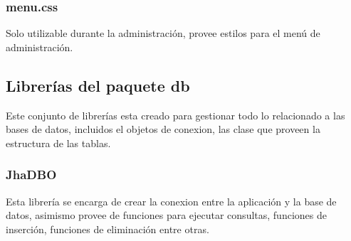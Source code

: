 \subsubsection{menu.css}
Solo utilizable durante la administraci\'on, provee estilos para el men\'u de administraci\'on.

\subsection{Librer\'ias del paquete \textsf{db}}
Este conjunto de librer\'ias esta creado para gestionar todo lo relacionado a las bases de datos, incluidos el objetos de conexion, las clase que proveen la estructura de las tablas.
\subsubsection{JhaDBO}
Esta librer\'ia se encarga de crear la conexion entre la aplicaci\'on y la base de datos, asimismo provee de funciones para ejecutar consultas, funciones de inserci\'on, funciones de eliminaci\'on entre otras.
